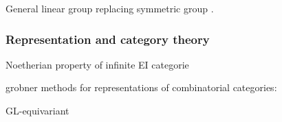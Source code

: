 General linear group replacing symmetric group \cite{}.

\subsubsection{Representation and category theory}

Noetherian property of infinite EI categorie \cite{gan2015noetherian}

\cite{putman2014representation}

grobner methods for representations of combinatorial categories: \cite{sam2016grobner}

GL-equivariant \cite{sam2016gl}









